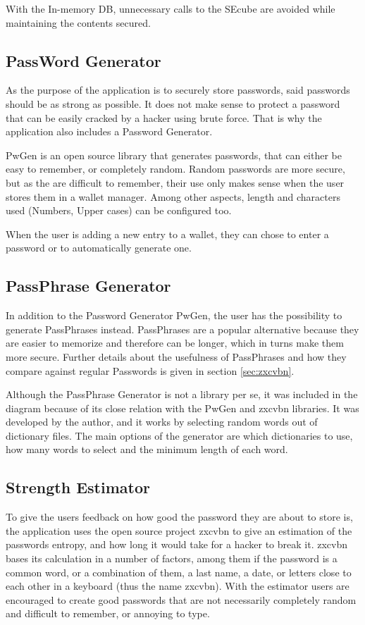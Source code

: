 With the In-memory DB, unnecessary calls to the SEcube are avoided while maintaining the contents secured.

\subsection{PassWord Generator}
As the purpose of the application is to securely store passwords, said passwords should be as strong as possible. It does not make sense to protect a password that can be easily cracked by a hacker using brute force. That is why the application also includes a Password Generator.

PwGen is an open source library that generates passwords, that can either be easy to remember, or completely random. Random passwords are more secure, but as the are difficult to remember, their use only makes sense when the user stores them in a wallet manager. Among other aspects, length and characters used (Numbers, Upper cases) can be configured too.

When the user is adding a new entry to a wallet, they can chose to enter a password or to automatically generate one.

\subsection{PassPhrase Generator}
In addition to the Password Generator PwGen, the user has the possibility to generate PassPhrases instead. PassPhrases are a popular alternative because they are easier to memorize and therefore can be longer, which in turns make them more secure. Further details about the usefulness of PassPhrases and how they compare against regular Passwords is given in section \ref{sec:zxcvbn}.

Although the PassPhrase Generator is not a library per se, it was included in the diagram because of its close relation with the PwGen and zxcvbn libraries. It was developed by the author, and it works by selecting random words out of dictionary files. The main options of the generator are which dictionaries to use, how many words to select and the minimum length of each word. 

\subsection{Strength Estimator}
To give the users feedback on how good the password they are about to store is, the application uses the open source project zxcvbn to give an estimation of the passwords entropy, and how long it would take for a hacker to break it. zxcvbn bases its calculation in a number of factors, among them if the password is a common word, or a combination of them, a last name, a date, or letters close to each other in a keyboard (thus the name zxcvbn). With the estimator users are encouraged to create good passwords that are not necessarily completely random and difficult to remember, or annoying to type.


